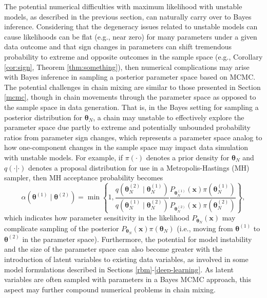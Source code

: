 \documentclass[]{article}
\theoremstyle{definition}
\begin{document}
The potential numerical difficulties with maximum likelihood with
unstable models, as described in the previous section, can naturally
carry over to Bayes inference. Considering that the degeneracy issues
related to unstable models can cause likelihoods can be flat (e.g., near
zero) for many parameters under a given data outcome and that sign
changes in parameters can shift tremendous probability to extreme and
opposite outcomes in the sample space (e.g., Corollary \ref{cor:sign},
Theorem \ref{thm:something}), then numerical complications may arise
with Bayes inference in sampling a posterior parameter space based on
MCMC. The potential challenges in chain mixing are similar to those
presented in Section \ref{mcmc}, though in chain movements through the
parameter space as opposed to the sample space in data generation. That
is, in the Bayes setting for sampling a posterior distribution for
\(\boldsymbol \theta_N\), a chain may unstable to effectively explore
the parameter space due partly to extreme and potentially unbounded
probability ratios from parameter sign changes, which represents a
parameter space analog to how one-component changes in the sample space
may impact data simulation with unstable models. For example, if
\(\pi(\cdot)\) denotes a prior density for \(\boldsymbol \theta_N\) and
\(q(\cdot | \cdot)\) denotes a proposal distribution for use in a
Metropolis-Hastings (MH) sampler, then MH acceptance probability becomes
\[
\alpha\left(\boldsymbol \theta^{(1)} \mid \boldsymbol \theta^{(2)}\right)= \min\left\{1,
\frac{q(\boldsymbol \theta_N^{(2)} \mid \boldsymbol \theta_N^{(1)})}{q(\boldsymbol \theta_N^{(1)} \mid \boldsymbol \theta_N^{(2)})}
\frac{P_{\boldsymbol \theta_N^{(1)}} ( \boldsymbol x ) \pi(\boldsymbol \theta_N^{(1)}) }{P_{\boldsymbol \theta^{(2)}_N} (  \boldsymbol x) \pi(\boldsymbol \theta_N^{(2)}) } \right\},
\] which indicates how parameter sensitivity in the likelihood
\(P_{\boldsymbol \theta_N} ( \boldsymbol x)\) may complicate sampling of
the posterior
\(P_{\boldsymbol \theta_N} ( \boldsymbol x) \pi(\boldsymbol \theta_N)\)
(i.e., moving from \(\boldsymbol \theta^{(1)}\) to
\(\boldsymbol \theta^{(2)}\) in the parameter space). Furthermore, the
potential for model instability and the size of the parameter space can
also become greater with the introduction of latent variables to
existing data variables, as involved in some model formulations
described in Sections \ref{rbm}-\ref{deep-learning}. As latent variables
are often sampled with parameters in a Bayes MCMC approach, this aspect
may further compound numerical problems in chain mixing.
\end{document}
